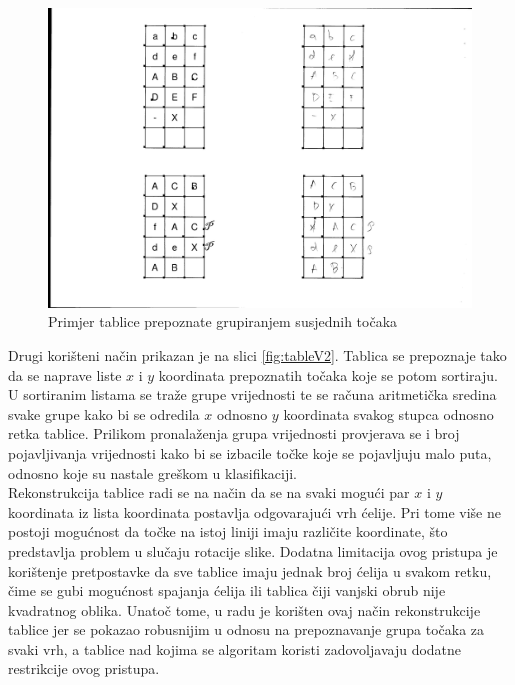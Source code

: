 \documentclass[times, utf8, zavrsni, numeric]{fer}
\begin{document}
\begin{figure}[!ht]
    \centering
    \includegraphics[width=.75\linewidth]{Images/tableV1.png}
    \captionsetup{justification=centering}
    \caption{Primjer tablice prepoznate grupiranjem susjednih točaka}
    \label{fig:tableV1}
\end{figure}

Drugi korišteni način prikazan je na slici \ref{fig:tableV2}.
Tablica se prepoznaje tako da se naprave liste $x$ i $y$ koordinata prepoznatih točaka koje se potom sortiraju.
U sortiranim listama se traže grupe vrijednosti te se računa aritmetička sredina svake grupe kako bi se odredila $x$ odnosno $y$ koordinata svakog stupca odnosno retka tablice. 
Prilikom pronalaženja grupa vrijednosti provjerava se i broj pojavljivanja vrijednosti kako bi se izbacile točke koje se pojavljuju malo puta, odnosno koje su nastale greškom u klasifikaciji.\\

Rekonstrukcija tablice radi se na način da se na svaki mogući par $x$
i $y$ koordinata iz lista koordinata postavlja odgovarajući vrh ćelije.
Pri tome više ne postoji mogućnost da točke na istoj liniji imaju različite koordinate, što predstavlja problem u slučaju rotacije slike.
Dodatna limitacija ovog pristupa je korištenje pretpostavke da sve tablice imaju jednak broj ćelija u svakom retku, čime se gubi mogućnost spajanja ćelija ili tablica čiji vanjski obrub nije kvadratnog oblika.
Unatoč tome, u radu je korišten ovaj način rekonstrukcije tablice jer se pokazao robusnijim u odnosu na prepoznavanje grupa točaka za svaki vrh, a tablice nad kojima se algoritam koristi zadovoljavaju dodatne restrikcije ovog pristupa.\\
\end{document}
